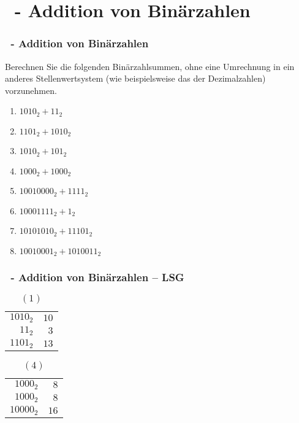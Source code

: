 \def\stitle{\theexercise\ - Addition von Binärzahlen}
\section{\stitle}
\begin{frame}[t]%
  \frametitle{\stitle}
\medskip

Berechnen Sie die folgenden Binärzahlsummen, ohne eine Umrechnung in ein anderes Stellenwertsystem (wie beispielsweise das der Dezimalzahlen) vorzunehmen.
\begin{center}
\begin{minipage}{0.45\textwidth}
\begin{enumerate}
\item $1010_2 +   11_2$
\item $1101_2 + 1010_2$
\item $1010_2 +  101_2$
\item $1000_2 + 1000_2$
\end{enumerate}
\end{minipage}
\begin{minipage}{0.45\textwidth}
\begin{enumerate}
\setcounter{enumi}{4}
\item $10010000_2 + 1111_2$
\item $10001111_2 + 1_2$
\item $10101010_2 + 11101_2$
\item $10010001_2 + 1010011_2$
\end{enumerate}
\end{minipage}
\end{center}

\end{frame}


\def\stitle{\theexercise\ - Addition von Binärzahlen -- LSG}
\begin{frame}
  \frametitle{\stitle}
\medskip

\begin{table}
\caption{$(1)$}
\begin{tabular}{r||r}
${1010}_2$ & $10$ \\
${11}_2$   & $3$  \\ \hline
${1101}_2$ & $13$
\end{tabular}
\end{table}

\begin{table}
\caption{$(4)$}
\begin{tabular}{r||r}
${1000}_2$  & $8$ \\
${1000}_2$  & $8$  \\ \hline
${10000}_2$ & $16$
\end{tabular}
\end{table}
\end{frame}
